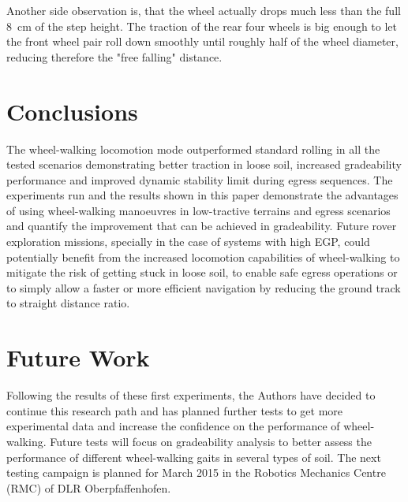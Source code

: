 \documentclass[a4paper,twocolumn]{esapub2005} %
\begin{document}
Another side observation is, that the wheel actually drops much less than the
full 8~\unit{cm} of the step height. The traction of the rear four wheels is big enough to
let the front wheel pair roll down smoothly until roughly half of the wheel
diameter, reducing therefore the "free falling" distance.


\section{Conclusions}
The wheel-walking locomotion mode outperformed standard rolling in all the
tested scenarios demonstrating better traction in loose soil, increased
gradeability performance and improved dynamic stability limit during egress
sequences. The experiments run and the results shown in this paper demonstrate
the advantages of using wheel-walking manoeuvres in low-tractive terrains and
egress scenarios and quantify the improvement that can be achieved in
gradeability.  Future rover exploration missions, specially in the case of
systems with high EGP, could potentially benefit from the increased locomotion
capabilities of wheel-walking to mitigate the risk of getting stuck in loose
soil, to enable safe egress operations or to simply allow a faster or more
efficient navigation by reducing the ground track to straight distance ratio.

\section{Future Work}
Following the results of these first experiments, the Authors have decided to
continue this research path and has planned further tests to get more
experimental data and increase the confidence on the performance of
wheel-walking.  Future tests will focus on gradeability analysis to better
assess the performance of different wheel-walking gaits in several types of
soil.  The next testing campaign is planned for March 2015 in the Robotics
Mechanics Centre (RMC) of DLR Oberpfaffenhofen.


\vspace{-3 mm}




\end{document}
